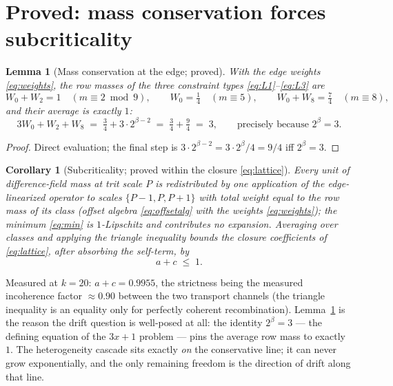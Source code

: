 \documentclass[11pt]{article}
\newtheorem{lemma}[theorem]{Lemma}
\newtheorem{corollary}[theorem]{Corollary}
\theoremstyle{definition}
\theoremstyle{remark}
\newcommand{\bet}{\beta}
\begin{document}
\section{Proved: mass conservation forces subcriticality}
\label{sec:mass}

\begin{lemma}[Mass conservation at the edge; proved]\label{lem:mass}
With the edge weights \eqref{eq:weights}, the row masses of the three
constraint types \eqref{eq:L1}--\eqref{eq:L3} are
\[
W_0 + W_2 = 1 \quad (m \equiv 2 \bmod 9), \qquad
W_0 = \tfrac14 \quad (m \equiv 5), \qquad
W_0 + W_8 = \tfrac74 \quad (m \equiv 8),
\]
and their average is exactly $1$:
\begin{equation}
3 W_0 + W_2 + W_8
\;=\; \tfrac34 + 3 \cdot 2^{\bet - 2}
\;=\; \tfrac34 + \tfrac94 \;=\; 3,
\qquad \text{precisely because } 2^{\bet} = 3 .
\label{eq:mass}
\end{equation}
\end{lemma}

\begin{proof}
Direct evaluation; the final step is
$3 \cdot 2^{\bet-2} = 3 \cdot 2^{\bet}/4 = 9/4$ iff $2^{\bet} = 3$.
\end{proof}

\begin{corollary}[Subcriticality; proved within the closure
\eqref{eq:lattice}]\label{cor:subcrit}
Every unit of difference-field mass at trit scale $P$ is redistributed by
one application of the edge-linearized operator to scales
$\{P-1, P, P+1\}$ with total weight equal to the row mass of its class
(offset algebra \eqref{eq:offsetalg} with the weights \eqref{eq:weights});
the minimum \eqref{eq:min} is $1$-Lipschitz and contributes no expansion.
Averaging over classes and applying the triangle inequality bounds the
closure coefficients of \eqref{eq:lattice}, after absorbing the self-term,
by
\[
a + c \;\leq\; 1 .
\]
\end{corollary}

Measured at $k = 20$: $a + c = 0.9955$, the strictness being the measured
incoherence factor $\approx 0.90$ between the two transport channels
(the triangle inequality is an equality only for perfectly coherent
recombination). Lemma~\ref{lem:mass} is the reason the drift question is
well-posed at all: the identity $2^{\bet} = 3$ --- the defining equation
of the $3x+1$ problem --- pins the average row mass to exactly $1$. The
heterogeneity cascade sits exactly \emph{on} the conservative line; it can
never grow exponentially, and the only remaining freedom is the direction
of drift along that line.
\end{document}
